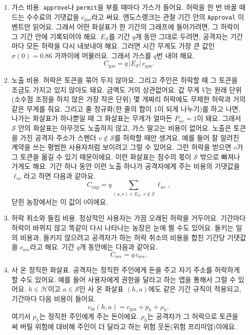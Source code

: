 \begin{enumerate}
\item 가스 비용. \texttt{approve}나 \texttt{permit}을 부를 때마다 가스가 들어요. 허락을 한 번 바꿀 때 드는 수수료의 기댓값을 $c_{\mathrm{gas}}$라고 써요. 엔도스랭크는 관찰 기간 안의 \texttt{Approval} 이벤트만 읽어요. 그래서 어떤 화살표가 한 기간의 그래프에 들어가려면, 그 허락이 그 기간 안에 기록되어야 해요. $E_{\mathcal{S}}$를 기간 $q$개 동안 그대로 두려면, 공격자는 기간마다 모든 허락을 다시 내보내야 해요. 그러면 시간 무게도 가장 큰 값인 $\sigma(0)=0.86$ 가까이에 머물러요. 그래서 가스를 $q$번 내야 해요.
\begin{equation*}
C_{\mathrm{gas}} = q\,|E_{\mathcal{S}}|\,c_{\mathrm{gas}}.
\end{equation*}

\item 노출 비용. 허락은 토큰을 묶어 두지 않아요. 그리고 주인은 허락할 때 그 토큰을 조금도 가지고 있지 않아도 돼요. 금액도 거의 상관없어요. 값 무게 $V$는 원래 단위(소수점 조정을 하지 않은 가장 작은 단위) 몇 개짜리 허락에도 무제한 허락과 거의 같은 무게를 줘요. 그리고 줄 정규화(한 줄의 합이 1이 되게 나누기)를 하고 나면, 나가는 화살표가 하나뿐일 때 그 화살표는 무게가 얼마든 $P_{uv}=1$이 돼요. 그래서 $\mathcal{S}$ 안의 화살표는 아무것도 노출하지 않고, 가스 말고는 비용이 없어요. 노출은 토큰을 가진 공격자 주소가 스펜더 $v\notin\mathcal{S}$를 허락할 때만 생겨요. 예를 들어 잘 알려진 계약을 쓰는 평범한 사용자처럼 보이려고 그럴 수 있어요. 그런 허락을 받으면 $v$가 그 토큰을 옮길 수 있기 때문이에요. 이런 화살표는 점수의 몫이 $\mathcal{S}$ 밖으로 빠져나가게도 해요. 기간 하나 동안 이런 노출 하나가 공격자에게 주는 비용의 기댓값을 $\ell_{uv}$라고 하면 다음과 같아요.
\begin{equation*}
C_{\mathrm{exp}} = q\sum_{(u,v)\in E_{\mathcal{S}},\ v\notin\mathcal{S}} \ell_{uv},
\end{equation*}
닫힌 농장에서는 이 값이 0이에요.

\item 허락 취소와 들킴 비용. 정상적인 사용자는 가끔 오래된 허락을 거두어요. 기간마다 허락이 바뀌지 않고 똑같이 다시 나타나는 농장은 눈에 띌 수도 있어요. 들키는 일의 비용과, 들키지 않으려고 공격자가 하는 허락 취소의 비용을 합친 기간당 기댓값을 $c_{\mathrm{rev}}$라고 해요. 기간 $q$개 동안에는 다음과 같아요.
\begin{equation*}
C_{\mathrm{rev}} = q\,c_{\mathrm{rev}}.
\end{equation*}

\item 사 온 정직한 화살표. 공격자는 정직한 주인에게 돈을 주고 자기 주소를 허락하게 할 수도 있어요. 예를 들어 사용자에게 권한을 달라고 하는 앱을 통해서 그럴 수 있어요. $h\in\mathcal{H}$이고 $a\in\mathcal{S}$인 사 온 화살표 $(h,a)$에도 같은 기간 규칙이 적용되고, 기간마다 다음 비용이 들어요.
\begin{equation}
\label{eq:marginal}
c_{\mathrm{in}}(h,a) = c_{\mathrm{gas}} + p_h + \rho_h,
\end{equation}
여기서 $p_h$는 정직한 주인에게 주는 돈이에요. $\rho_h$는 공격자가 그 허락으로 토큰을 써 버릴 위험에 대비해 주인이 더 달라고 하는 위험 웃돈(위험 프리미엄)이에요.
\end{enumerate}

